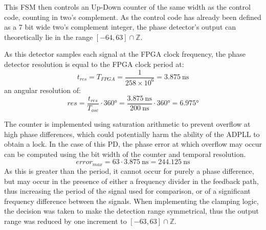 This \ac{FSM} then controls an Up-Down counter of the same width as the control code, counting in two's complement. As the control code has already been defined as a 7 bit wide two's complement integer, the phase detector's output can theoretically lie in the range $[-64,63]\cap\mathbb{Z}$. 

As this detector samples each signal at the \ac{FPGA} clock frequency, the phase detector resolution is equal to the \ac{FPGA} clock period at:
\begin{equation}
t_{res} = T_{FPGA} = \frac{1}{258\times 10^{6}} = 3.875~\si{\nano\second}
\end{equation}
an angular resolution of:
\begin{equation}
res = \frac{t_{res}}{T_{osc}} \cdot 360\si{\degree} = \frac{3.875~\si{\nano\second}}{200~\si{\nano\second}} \cdot 360\si{\degree} = 6.975\si{\degree}
\end{equation}

The counter is implemented using saturation arithmetic to prevent overflow at high phase differences, which could potentially harm the ability of the \ac{ADPLL} to obtain a lock. In the case of this \ac{PD}, the phase error at which overflow may occur can be computed using the bit width of the counter and temporal resolution. 
\begin{equation}
error_{max} = 63\cdot3.875~\si{\nano\second} = 244.125~\si{\nano\second} 
\end{equation}
As this is greater than the period, it cannot occur for purely a phase difference, but may occur in the presence of either a frequency divider in the feedback path, thus increasing the period of the signal used for comparison, or of a significant frequency difference between the signals. When implementing the clamping logic, the decision was taken to make the detection range symmetrical, thus the output range was reduced by one increment to $[-63,63]\cap\mathbb{Z}$.

